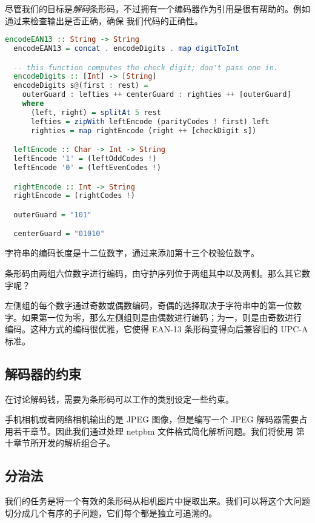 \documentclass[./main.tex]{subfiles}
\begin{document}
尽管我们的目标是\textit{解码}条形码，不过拥有一个编码器作为引用是很有帮助的。例如通过来检查输出是否正确，确保
我们代码的正确性。

\begin{lstlisting}[language=Haskell]
  encodeEAN13 :: String -> String
  encodeEAN13 = concat . encodeDigits . map digitToInt

  -- this function computes the check digit; don't pass one in.
  encodeDigits :: [Int] -> [String]
  encodeDigits s@(first : rest) =
    outerGuard : lefties ++ centerGuard : righties ++ [outerGuard]
    where
      (left, right) = splitAt 5 rest
      lefties = zipWith leftEncode (parityCodes ! first) left
      righties = map rightEncode (right ++ [checkDigit s])

  leftEncode :: Char -> Int -> String
  leftEncode '1' = (leftOddCodes !)
  leftEncode '0' = (leftEvenCodes !)

  rightEncode :: Int -> String
  rightEncode = (rightCodes !)

  outerGuard = "101"

  centerGuard = "01010"
\end{lstlisting}

字符串的编码长度是十二位数字，通过来添加第十三个校验位数字。

条形码由两组六位数字进行编码，由守护序列位于两组其中以及两侧。那么其它数字呢？

左侧组的每个数字通过奇数或偶数编码，奇偶的选择取决于字符串中的第一位数字。如果第一位为零，那么左侧组则是由偶数进行编码；为一，则是由奇数进行
编码。这种方式的编码很优雅，它使得 EAN-13 条形码变得向后兼容旧的 UPC-A 标准。

\subsection*{解码器的约束}

在讨论解码钱，需要为条形码可以工作的类别设定一些约束。

手机相机或者网络相机输出的是 JPEG 图像，但是编写一个 JPEG 解码器需要占用若干章节。因此我们通过处理 netpbm 文件格式简化解析问题。我们将使用
第十章节所开发的解析组合子。

\subsection*{分治法}

我们的任务是将一个有效的条形码从相机图片中提取出来。我们可以将这个大问题切分成几个有序的子问题，它们每个都是独立可追溯的。
\end{document}
